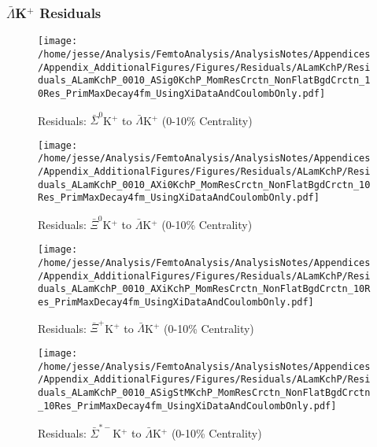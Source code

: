 \documentclass[/home/jesse/Analysis/FemtoAnalysis/AnalysisNotes/AnalysisNoteJBuxton.tex]{subfiles}
\begin{document}
\subsubsection{\texorpdfstring{$\bar{\Lambda}$K$^{+}$}{TEXT} Residuals}
\label{Residuals_ALamKchP}

\begin{figure}[h]
  \centering
  \texttt{[image: /home/jesse/Analysis/FemtoAnalysis/AnalysisNotes/Appendices/Appendix\_AdditionalFigures/Figures/Residuals/ALamKchP/Residuals\_ALamKchP\_0010\_ASig0KchP\_MomResCrctn\_NonFlatBgdCrctn\_10Res\_PrimMaxDecay4fm\_UsingXiDataAndCoulombOnly.pdf]}
  \caption[Residuals: $\bar{\Sigma}^{0}$K$^{+}$ to $\bar{\Lambda}$K$^{+}$ (0-10\% Centrality)]{Residuals: $\bar{\Sigma}^{0}$K$^{+}$ to $\bar{\Lambda}$K$^{+}$ (0-10\% Centrality)}
  \label{fig:Res_ALamKchP_0010_ASig0KchP}
\end{figure}

\begin{figure}[h]
  \centering
  \texttt{[image: /home/jesse/Analysis/FemtoAnalysis/AnalysisNotes/Appendices/Appendix\_AdditionalFigures/Figures/Residuals/ALamKchP/Residuals\_ALamKchP\_0010\_AXi0KchP\_MomResCrctn\_NonFlatBgdCrctn\_10Res\_PrimMaxDecay4fm\_UsingXiDataAndCoulombOnly.pdf]}
  \caption[Residuals: $\bar{\Xi}^{0}$K$^{+}$ to $\bar{\Lambda}$K$^{+}$ (0-10\% Centrality)]{Residuals: $\bar{\Xi}^{0}$K$^{+}$ to $\bar{\Lambda}$K$^{+}$ (0-10\% Centrality)}
  \label{fig:Res_ALamKchP_0010_AXi0KchP}
\end{figure}


\begin{figure}[h]
  \centering
  \texttt{[image: /home/jesse/Analysis/FemtoAnalysis/AnalysisNotes/Appendices/Appendix\_AdditionalFigures/Figures/Residuals/ALamKchP/Residuals\_ALamKchP\_0010\_AXiKchP\_MomResCrctn\_NonFlatBgdCrctn\_10Res\_PrimMaxDecay4fm\_UsingXiDataAndCoulombOnly.pdf]}
  \caption[Residuals: $\bar{\Xi}^{+}$K$^{+}$ to $\bar{\Lambda}$K$^{+}$ (0-10\% Centrality)]{Residuals: $\bar{\Xi}^{+}$K$^{+}$ to $\bar{\Lambda}$K$^{+}$ (0-10\% Centrality)}
  \label{fig:Res_ALamKchP_0010_AXiCKchP}
\end{figure}


\begin{figure}[h]
  \centering
  \texttt{[image: /home/jesse/Analysis/FemtoAnalysis/AnalysisNotes/Appendices/Appendix\_AdditionalFigures/Figures/Residuals/ALamKchP/Residuals\_ALamKchP\_0010\_ASigStMKchP\_MomResCrctn\_NonFlatBgdCrctn\_10Res\_PrimMaxDecay4fm\_UsingXiDataAndCoulombOnly.pdf]}
  \caption[Residuals: $\bar{\Sigma}^{*-}$K$^{+}$ to $\bar{\Lambda}$K$^{+}$ (0-10\% Centrality)]{Residuals: $\bar{\Sigma}^{*-}$K$^{+}$ to $\bar{\Lambda}$K$^{+}$ (0-10\% Centrality)}
  \label{fig:Res_ALamKchP_0010_ASigStMKchP}
\end{figure}
\end{document}

